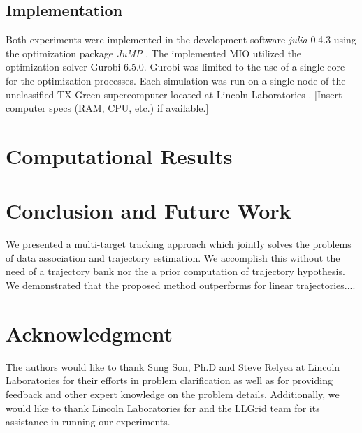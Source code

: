 \documentclass[journal]{IEEEtran}
\begin{document}
\subsection{Implementation}
Both experiments were implemented in the development software \textit{julia} 0.4.3 \cite{julia} using the optimization package \textit{JuMP} \cite{JuMP}. The implemented MIO utilized the optimization solver Gurobi 6.5.0\cite{gurobi}. Gurobi was limited to the use of a single core for the optimization processes. Each simulation was run on a single node of the unclassified TX-Green supercomputer located at Lincoln Laboratories \cite{LLGrid}. [Insert computer specs (RAM, CPU, etc.) if available.]

\section{Computational Results}


\section{Conclusion and Future Work}
We presented a multi-target tracking approach which jointly solves the problems of data association and trajectory estimation. We accomplish this without the need of a trajectory bank nor the a prior computation of trajectory hypothesis. We demonstrated that the proposed method outperforms for linear trajectories....

\section*{Acknowledgment}
The authors would like to thank Sung Son, Ph.D and Steve Relyea at Lincoln Laboratories for their efforts in problem clarification as well as for providing feedback and other expert knowledge on the problem details. Additionally, we would like to thank Lincoln Laboratories for and the LLGrid team for its assistance in running our experiments. 







%

\end{document}
